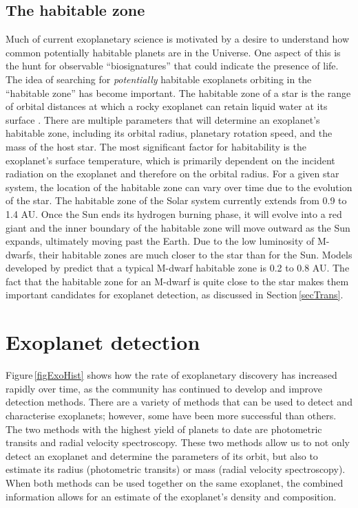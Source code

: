 \subsection{The habitable zone}
\label{secHab}
Much of current exoplanetary science is motivated by a desire to understand how common potentially habitable planets are in the Universe. One aspect of this is the hunt for observable ``biosignatures'' that could indicate the presence of life. The idea of searching for {\em potentially} habitable exoplanets orbiting in the ``habitable zone'' has become important. The habitable zone of a star is the range of orbital distances at which a rocky exoplanet can retain liquid water at its surface \citep{1993Kasting}. There are multiple parameters that will determine an exoplanet's habitable zone, including its orbital radius, planetary rotation speed, and the mass of the host star. The most significant factor for habitability is the exoplanet's surface temperature, which is primarily dependent on the incident radiation on the exoplanet and therefore on the orbital radius. For a given star system, the location of the habitable zone can vary over time due to the evolution of the star. The habitable zone of the Solar system currently extends from 0.9 to 1.4 AU. Once the Sun ends its hydrogen burning phase, it will evolve into a red giant and the inner boundary of the habitable zone will move outward as the Sun expands, ultimately moving past the Earth. Due to the low luminosity of M-dwarfs, their habitable zones are much closer to the star than for the Sun. Models developed by \citet{2013Kopparapu} predict that a typical M-dwarf habitable zone is 0.2 to 0.8 AU. The fact that the habitable zone for an M-dwarf is quite close to the star makes them important candidates for exoplanet detection, as discussed in Section\,\ref{secTrans}.\\

\section{Exoplanet detection}
\label{secDetectMeth}
Figure\,\ref{figExoHist} shows how the rate of exoplanetary discovery has increased rapidly over time, as the community has continued to develop and improve detection methods. There are a variety of methods that can be used to detect and characterise exoplanets; however, some have been more successful than others. The two methods with the highest yield of planets to date are photometric transits and radial velocity spectroscopy. These two methods allow us to not only detect an exoplanet and determine the parameters of its orbit, but also to estimate its radius (photometric transits) or mass (radial velocity spectroscopy). When both methods can be used together on the same exoplanet, the combined information allows for an estimate of the exoplanet's density and composition.\\

